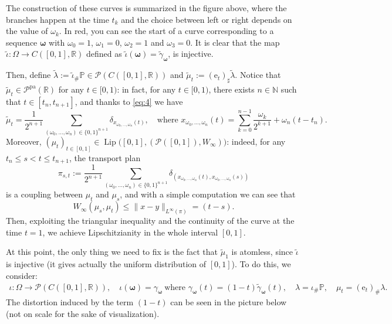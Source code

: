 \documentclass[10pt,leqno]{amsart}
\numberwithin{equation}{section}
\newcommand{\R}{\mathbb{R}}
\newcommand{\N}{\mathbb{N}}
\newcommand{\PP}{\mathcal{P}}
\newcommand{\PPpa}{\PP^{\operatorname{pa}}}
\newcommand{\e}{\mathrm{e}}
\begin{document}
\begin{center}

\end{center}

The construction of these curves is summarized in the figure above, where the branches happen at the time $t_k$ and the choice between left or right depends on the value of $\omega_k$. In red, you can see the start of a curve corresponding to a sequence $\boldsymbol{\omega}$ with $\omega_0 = 1$, $\omega_1 = 0$, $\omega_2 = 1$ and $\omega_3 = 0$. It is clear that the map $\tilde{\iota}: \Omega \to C([0,1],\R)$ defined as $\tilde{\iota}(\boldsymbol{\omega}) = \tilde{\gamma}_{\boldsymbol{\omega}}$, is injective. 


Then, define $\tilde{\lambda}:= \tilde{\iota}_\#\mathbb{P} \in \PP(C([0,1],\R))$ and $\tilde{\mu}_t:= (\e_t)_\sharp \tilde{\lambda}$. Notice that $\tilde{\mu}_t\in \PPpa(\R)$ for any $t\in[0,1)$: in fact, for any $t\in[0,1)$, there exists $n\in \N$ such that $t \in [t_n,t_{n+1}]$, and thanks to \eqref{eq:4} we have 
\[\tilde{\mu}_t = \frac{1}{2^{n+1}} \sum_{(\omega_0,\dots,\omega_n) \in \{0,1\}^{n+1}} \delta_{x_{\omega_0,\dots,\omega_n}(t)}, \quad \text{where }x_{\omega_0,\dots,\omega_n}(t) = \sum_{k=0}^{n-1} \frac{\omega_k}{2^{k+1}} + \omega_n(t-t_n).\]
Moreover, $(\mu_t)_{t\in[0,1]} \in \operatorname{Lip}\big([0,1],(\PP([0,1]),W_\infty)\big)$: indeed, for any $t_n\leq s<t \leq t_{n+1}$, the transport plan
\[\pi_{s,t}:=\frac{1}{2^{n+1}} \sum_{(\omega_0,\dots,\omega_n) \in \{0,1\}^{n+1}} \delta_{(x_{\omega_0,\dots,\omega_n}(t), x_{\omega_0,\dots,\omega_n}(s))} \]
is a coupling between $\mu_t$ and $\mu_s$, and with a simple computation we can see that 
\[W_{\infty}(\mu_s,\mu_t) \leq \|x-y\|_{L^\infty(\pi)} = (t-s).\]
Then, exploiting the triangular inequality and the continuity of the curve at the time $t=1$, we achieve Lipschitzianity in the whole interval $[0,1]$.

At this point, the only thing we need to fix is the fact that $\tilde{\mu}_1$ is atomless, since $\tilde{\iota}$ is injective (it gives actually the uniform distribution of $[0,1]$). To do this, we consider:
\begin{equation}
    \begin{aligned}
        \iota:\Omega \to \PP(C([0,1],\R)), \quad \iota(\boldsymbol{\omega}) = \gamma_{\boldsymbol{\omega}} \ \text{where } \gamma_{\boldsymbol{\omega}}(t) = (1-t) \tilde{\gamma}_{\boldsymbol{\omega}}(t),\quad 
        \lambda = \iota_\# \mathbb{P}, \quad \mu_t = (\e_t)_\#\lambda.
    \end{aligned}
\end{equation}
The distortion induced  by the term $(1-t)$ can be seen in the picture below (not on scale for the sake of visualization).
\end{document}
